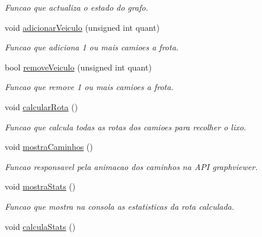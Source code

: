 \begin{DoxyCompactItemize}
\begin{DoxyCompactList}\small\item\em Funcao que actualiza o estado do grafo. \end{DoxyCompactList}\item 
void \hyperlink{class_gestor_a266d40d2550b75f8cabf7107e7865f74}{adicionar\-Veiculo} (unsigned int quant)
\begin{DoxyCompactList}\small\item\em Funcao que adiciona 1 ou mais camioes a frota. \end{DoxyCompactList}\item 
bool \hyperlink{class_gestor_a71b6932c0de11f652c0201cfb1aadfe6}{remove\-Veiculo} (unsigned int quant)
\begin{DoxyCompactList}\small\item\em Funcao que remove 1 ou mais camioes a frota. \end{DoxyCompactList}\item 
\hypertarget{class_gestor_a68730dd19a6abd889c9958b5c41c85d6}{void \hyperlink{class_gestor_a68730dd19a6abd889c9958b5c41c85d6}{calcular\-Rota} ()}\label{class_gestor_a68730dd19a6abd889c9958b5c41c85d6}

\begin{DoxyCompactList}\small\item\em Funcao que calcula todas as rotas dos camioes para recolher o lixo. \end{DoxyCompactList}\item 
\hypertarget{class_gestor_afb4de6dbc2a4cf17fa22ca89cc80d918}{void \hyperlink{class_gestor_afb4de6dbc2a4cf17fa22ca89cc80d918}{mostra\-Caminhos} ()}\label{class_gestor_afb4de6dbc2a4cf17fa22ca89cc80d918}

\begin{DoxyCompactList}\small\item\em Funcao responsavel pela animacao dos caminhos na A\-P\-I graphviewer. \end{DoxyCompactList}\item 
\hypertarget{class_gestor_ad493cbd9874ffd6d68e1cf35661e1304}{void \hyperlink{class_gestor_ad493cbd9874ffd6d68e1cf35661e1304}{mostra\-Stats} ()}\label{class_gestor_ad493cbd9874ffd6d68e1cf35661e1304}

\begin{DoxyCompactList}\small\item\em Funcao que mostra na consola as estatisticas da rota calculada. \end{DoxyCompactList}\item 
\hypertarget{class_gestor_a4d4e9889e86624ba727dd15c171f8c4f}{void \hyperlink{class_gestor_a4d4e9889e86624ba727dd15c171f8c4f}{calcula\-Stats} ()}\label{class_gestor_a4d4e9889e86624ba727dd15c171f8c4f}


\end{DoxyCompactItemize}
